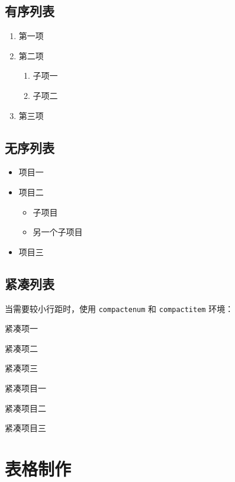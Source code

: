 \subsection{有序列表}
\begin{enumerate}
  \item 第一项
  \item 第二项
  \begin{enumerate}
    \item 子项一
    \item 子项二
  \end{enumerate}
  \item 第三项
\end{enumerate}

\subsection{无序列表}
\begin{itemize}
  \item 项目一
  \item 项目二
  \begin{itemize}
    \item 子项目
    \item 另一个子项目
  \end{itemize}
  \item 项目三
\end{itemize}

\subsection{紧凑列表}
当需要较小行距时，使用 \texttt{compactenum} 和 \texttt{compactitem} 环境：

\begin{compactenum}
  \item 紧凑项一
  \item 紧凑项二
  \item 紧凑项三
\end{compactenum}

\begin{compactitem}
  \item 紧凑项目一
  \item 紧凑项目二
  \item 紧凑项目三
\end{compactitem}

\section{表格制作}
\label{sec:tables_basic}

